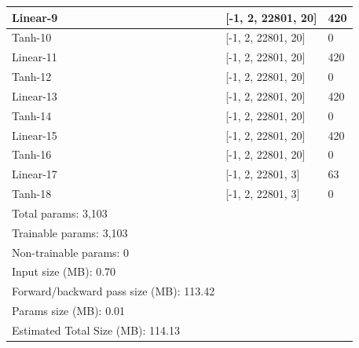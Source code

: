 \documentclass{article}
\begin{document}
\begin{table}[H]
\begin{tabular}{lll}
			\multicolumn{1}{|l|}{Linear-9}               & \multicolumn{1}{l|}{{[}-1, 2, 22801, 20{]}} & \multicolumn{1}{l|}{420}      \\ \hline
			\multicolumn{1}{|l|}{Tanh-10}                & \multicolumn{1}{l|}{{[}-1, 2, 22801, 20{]}} & \multicolumn{1}{l|}{0}        \\ \hline
			\multicolumn{1}{|l|}{Linear-11}              & \multicolumn{1}{l|}{{[}-1, 2, 22801, 20{]}} & \multicolumn{1}{l|}{420}      \\ \hline
			\multicolumn{1}{|l|}{Tanh-12}                & \multicolumn{1}{l|}{{[}-1, 2, 22801, 20{]}} & \multicolumn{1}{l|}{0}        \\ \hline
			\multicolumn{1}{|l|}{Linear-13}              & \multicolumn{1}{l|}{{[}-1, 2, 22801, 20{]}} & \multicolumn{1}{l|}{420}      \\ \hline
			\multicolumn{1}{|l|}{Tanh-14}                & \multicolumn{1}{l|}{{[}-1, 2, 22801, 20{]}} & \multicolumn{1}{l|}{0}        \\ \hline
			\multicolumn{1}{|l|}{Linear-15}              & \multicolumn{1}{l|}{{[}-1, 2, 22801, 20{]}} & \multicolumn{1}{l|}{420}      \\ \hline
			\multicolumn{1}{|l|}{Tanh-16}                & \multicolumn{1}{l|}{{[}-1, 2, 22801, 20{]}} & \multicolumn{1}{l|}{0}        \\ \hline
			\multicolumn{1}{|l|}{Linear-17}              & \multicolumn{1}{l|}{{[}-1, 2, 22801, 3{]}}  & \multicolumn{1}{l|}{63}       \\ \hline
			\multicolumn{1}{|l|}{Tanh-18}                & \multicolumn{1}{l|}{{[}-1, 2, 22801, 3{]}}  & \multicolumn{1}{l|}{0}        \\ \hline
			\multicolumn{1}{|l}{Total params: 3,103}     &                                             & \multicolumn{1}{l|}{}         \\
			\multicolumn{1}{|l}{Trainable params: 3,103} &                                             & \multicolumn{1}{l|}{}         \\
			\multicolumn{1}{|l}{Non-trainable params: 0} &                                             & \multicolumn{1}{l|}{}         \\ \hline
			Input size (MB): 0.70                        &                                             &                               \\
			Forward/backward pass size (MB): 113.42      &                                             &                               \\
			Params size (MB): 0.01                       &                                             &                               \\
			Estimated Total Size (MB): 114.13            &                                             &                              
		\end{tabular}
	\end{table}
    
\end{document}
